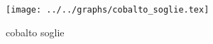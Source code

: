 \begin{figure}[h] \centering\texttt{[image: ../../graphs/cobalto\_soglie.tex]}\caption{cobalto soglie}\label{gr:cobalto_soglie} \end{figure}
